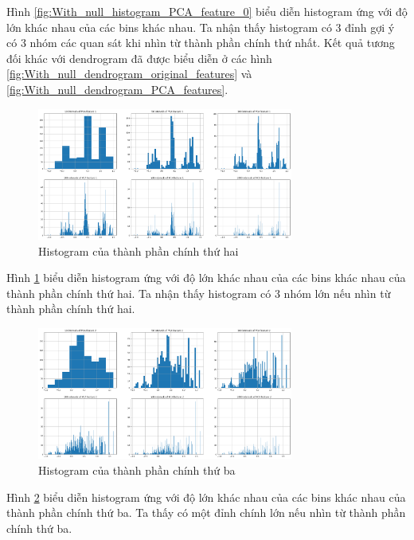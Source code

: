Hình \ref{fig:With_null_histogram_PCA_feature_0} biểu diễn histogram ứng với độ lớn khác nhau của các bins khác nhau.
Ta nhận thấy histogram có 3 đỉnh gợi ý có 3 nhóm các quan sát khi nhìn từ thành phần chính thứ nhất.
Kết quả tương đối khác với dendrogram đã được biểu diễn ở các hình \ref{fig:With_null_dendrogram_original_features} và \ref{fig:With_null_dendrogram_PCA_features}.

\begin{figure}[H]
    \centering
    \includegraphics[width=0.75\textwidth]{figures/Thanh/Data_Analysis/With_null_histogram_PCA_feature_1.png}
    \caption{Histogram của thành phần chính thứ hai}
    \label{fig:With_null_histogram_PCA_feature_1}
\end{figure}

Hình \ref{fig:With_null_histogram_PCA_feature_1} biểu diễn histogram ứng với độ lớn khác nhau của các bins khác nhau của thành phần chính thứ hai.
Ta nhận thấy histogram có 3 nhóm lớn nếu nhìn từ thành phần chính thứ hai.

\begin{figure}[H]
    \centering
    \includegraphics[width=0.75\textwidth]{figures/Thanh/Data_Analysis/With_null_histogram_PCA_feature_2.png}
    \caption{Histogram của thành phần chính thứ ba}
    \label{fig:With_null_histogram_PCA_feature_2}
\end{figure}

Hình \ref{fig:With_null_histogram_PCA_feature_2} biểu diễn histogram ứng với độ lớn khác nhau của các bins khác nhau của thành phần chính thứ ba.
Ta thấy có một đỉnh chính lớn nếu nhìn từ thành phần chính thứ ba.


